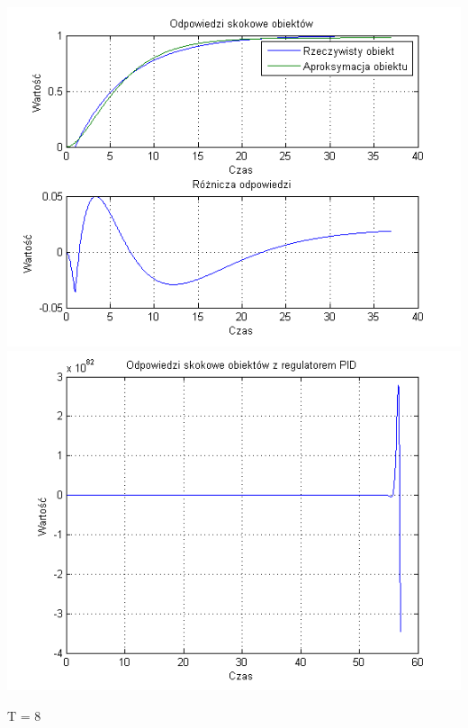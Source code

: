 \documentclass[10pt,a4paper]{article}
\begin{document}
\begin{center}
\includegraphics[scale=1]{images/dwa/skrypt_25.png}\\
\includegraphics[scale=1]{images/dwa/skrypt_26.png}\\
\end{center}
\newpage
T = 8
\end{document}
